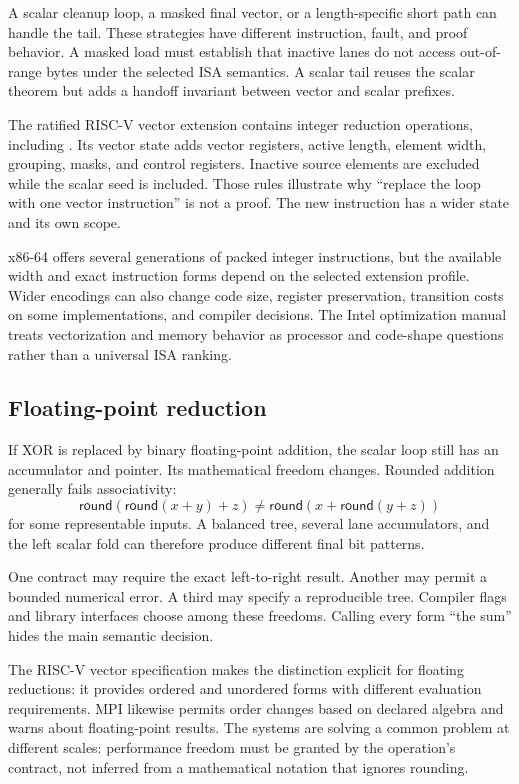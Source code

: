 A scalar cleanup loop, a masked final vector, or a length-specific short path
can handle the tail. These strategies have different instruction, fault, and
proof behavior. A masked load must establish that inactive lanes do not access
out-of-range bytes under the selected ISA semantics. A scalar tail reuses the
scalar theorem but adds a handoff invariant between vector and scalar prefixes.

The ratified RISC-V vector extension contains integer reduction operations,
including . Its vector state adds vector registers, active
length, element width, grouping, masks, and control registers. Inactive source
elements are excluded while the scalar seed is included.
\autocite{riscv2026vector} Those rules illustrate why ``replace the loop with
one vector instruction'' is not a proof. The new instruction has a wider state
and its own scope.

x86-64 offers several generations of packed integer instructions, but the
available width and exact instruction forms depend on the selected extension
profile. Wider encodings can also change code size, register preservation,
transition costs on some implementations, and compiler decisions. The Intel
optimization manual treats vectorization and memory behavior as processor and
code-shape questions rather than a universal ISA ranking.
\autocite{intel2026optimization}

\subsection{Floating-point reduction}

If XOR is replaced by binary floating-point addition, the scalar loop still
has an accumulator and pointer. Its mathematical freedom changes. Rounded
addition generally fails associativity:
\[
  \mathsf{round}(\mathsf{round}(x+y)+z)
  \ne
  \mathsf{round}(x+\mathsf{round}(y+z))
\]
for some representable inputs. A balanced tree, several lane accumulators, and
the left scalar fold can therefore produce different final bit patterns.

One contract may require the exact left-to-right result. Another may permit a
bounded numerical error. A third may specify a reproducible tree. Compiler
flags and library interfaces choose among these freedoms. Calling every form
``the sum'' hides the main semantic decision.

The RISC-V vector specification makes the distinction explicit for floating
reductions: it provides ordered and unordered forms with different evaluation
requirements. MPI likewise permits order changes based on declared algebra
and warns about floating-point results. The systems are solving a common
problem at different scales: performance freedom must be granted by the
operation's contract, not inferred from a mathematical notation that ignores
rounding.


